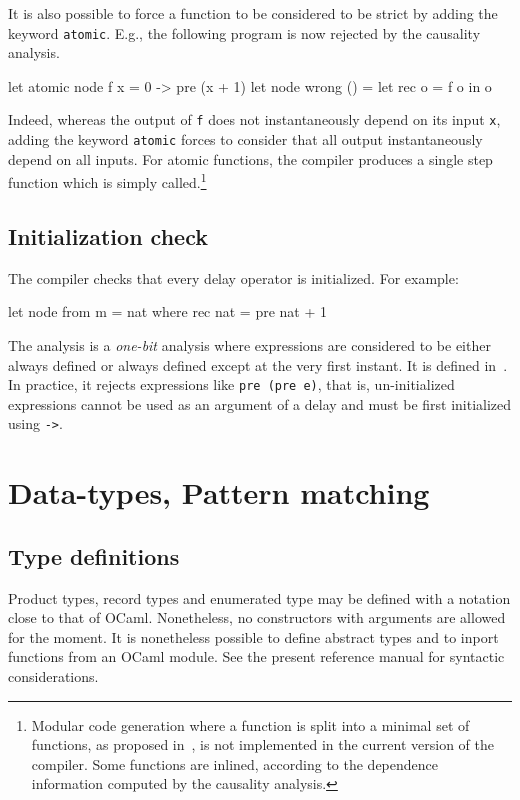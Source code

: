 \documentclass[11pt,titlepage,twoside]{report}
\newcommand{\ocaml}{{\sf OCaml}}
\begin{document}
It is also possible to force a function to be considered to be strict
by adding the keyword \texttt{atomic}. E.g., the following program is
now rejected by the causality analysis.
%
\begin{runverbatim}
let atomic node f x = 0 -> pre (x + 1)
let node wrong () =
  let rec o = f o in o
\end{runverbatim}
%
Indeed, whereas the output of \texttt{f} does not instantaneously
depend on its input \texttt{x}, adding the keyword \texttt{atomic}
forces to consider that all output instantaneously depend on all
inputs. For atomic functions, the compiler produces a single step
function which is simply called.\footnote{Modular code generation
  where a function is split into a minimal set of functions, as
  proposed in~\cite{lucy:emsoft09,lustre:tripakis-popl09}, is not
  implemented in the current version of the compiler. Some functions
  are inlined, according to the dependence information
  computed by the causality analysis.}

\subsection{Initialization check} %
\label{initialisation-check}
The compiler checks that every delay operator is initialized. For
example:
\begin{runverbatim}
let node from m = nat where
  rec nat = pre nat + 1
\end{runverbatim}
The analysis is a {\em one-bit} analysis where expressions are
considered to be either always defined or always defined except at the
very first instant.  It is defined in~\cite{lucy:sttt04}. In
practice, it rejects expressions like \verb-pre (pre e)-, that is,
un-initialized expressions cannot be used as an argument of a delay
and must be first initialized using \verb+->+.

\section{Data-types, Pattern matching} %

\subsection{Type definitions} %
Product types, record types and enumerated type may be defined with a
notation close to that of \ocaml. Nonetheless, no constructors with
arguments are allowed for the moment. It is nonetheless possible to
define abstract types and to inport functions from an \ocaml{} module.
See the present reference manual for syntactic considerations.
\end{document}
